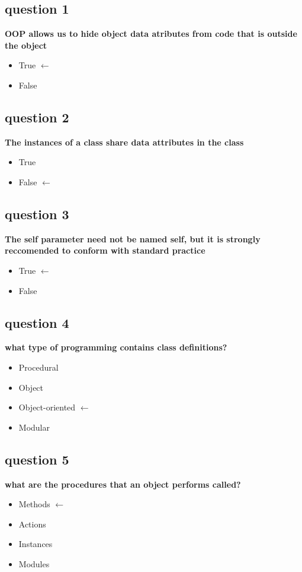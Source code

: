 \documentclass[10pt]{article}
\begin{document}
\subsection*{question 1}
\textbf{OOP allows us to hide object data atributes from code that is outside the object}
\begin{itemize}
\item True $\leftarrow$
\item False
\end{itemize}
\subsection*{question 2}
\textbf{The instances of a class share data attributes in the class}
\begin{itemize}
\item True
\item False $\leftarrow$
\end{itemize}
\subsection*{question 3}
\textbf{The self parameter need not be named self, but it is strongly reccomended to conform with standard practice}
\begin{itemize}
\item True $\leftarrow$
\item False
\end{itemize}
\subsection*{question 4}
\textbf{what type of programming contains class definitions?}
\begin{itemize}
\item Procedural
\item Object
\item Object-oriented $\leftarrow$
\item Modular
\end{itemize}
\subsection*{question 5}
\textbf{what are the procedures that an object performs called?}
\begin{itemize}
\item Methods $\leftarrow$
\item Actions
\item Instances
\item Modules
\end{itemize}
\end{document}
